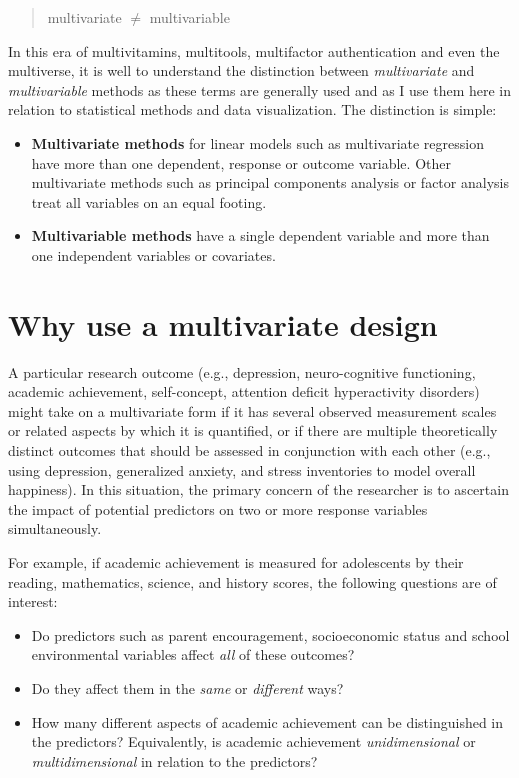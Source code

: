 \documentclass[
  letterpaper,
  10pt,
  krantz2]{krantz}
\begin{document}
\begin{quote}
multivariate \(\ne\) multivariable
\end{quote}

In this era of multivitamins, multitools, multifactor authentication and
even the multiverse, it is well to understand the distinction between
\emph{multivariate} and \emph{multivariable} methods as these terms are
generally used and as I use them here in relation to statistical methods
and data visualization. The distinction is simple:

\begin{itemize}
\item
  \textbf{Multivariate methods} for linear models such as multivariate
  regression have more than one dependent, response or outcome variable.
  Other multivariate methods such as principal components analysis or
  factor analysis treat all variables on an equal footing.
\item
  \textbf{Multivariable methods} have a single dependent variable and
  more than one independent variables or covariates.
\end{itemize}

\section{Why use a multivariate
design}\label{why-use-a-multivariate-design}

A particular research outcome (e.g., depression, neuro-cognitive
functioning, academic achievement, self-concept, attention deficit
hyperactivity disorders) might take on a multivariate form if it has
several observed measurement scales or related aspects by which it is
quantified, or if there are multiple theoretically distinct outcomes
that should be assessed in conjunction with each other (e.g., using
depression, generalized anxiety, and stress inventories to model overall
happiness). In this situation, the primary concern of the researcher is
to ascertain the impact of potential predictors on two or more response
variables simultaneously.

For example, if academic achievement is measured for adolescents by
their reading, mathematics, science, and history scores, the following
questions are of interest:

\begin{itemize}
\item
  Do predictors such as parent encouragement, socioeconomic status and
  school environmental variables affect \emph{all} of these outcomes?
\item
  Do they affect them in the \emph{same} or \emph{different} ways?
\item
  How many different aspects of academic achievement can be
  distinguished in the predictors? Equivalently, is academic achievement
  \emph{unidimensional} or \emph{multidimensional} in relation to the
  predictors?
\end{itemize}
\end{document}

